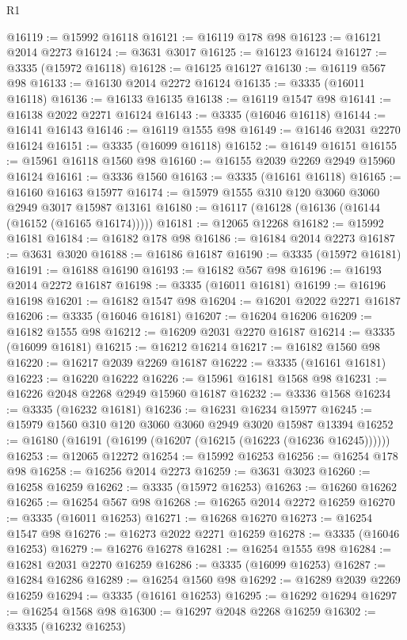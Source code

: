 \begin{lexlean}{R1}
\begin{coremodule}
@16119 := @15992 @16118
@16121 := @16119 @178 @98
@16123 := @16121 @2014 @2273
@16124 := @3631 @3017
@16125 := @16123 @16124
@16127 := @3335 (@15972 @16118)
@16128 := @16125 @16127
@16130 := @16119 @567 @98
@16133 := @16130 @2014 @2272 @16124
@16135 := @3335 (@16011 @16118)
@16136 := @16133 @16135
@16138 := @16119 @1547 @98
@16141 := @16138 @2022 @2271 @16124
@16143 := @3335 (@16046 @16118)
@16144 := @16141 @16143
@16146 := @16119 @1555 @98
@16149 := @16146 @2031 @2270 @16124
@16151 := @3335 (@16099 @16118)
@16152 := @16149 @16151
@16155 := @15961 @16118 @1560 @98
@16160 := @16155 @2039 @2269 @2949 @15960 @16124
@16161 := @3336 @1560
@16163 := @3335 (@16161 @16118)
@16165 := @16160 @16163 @15977
@16174 := @15979 @1555 @310 @120 @3060 @3060 @2949 @3017 @15987 @13161
@16180 := @16117 (@16128 (@16136 (@16144 (@16152 (@16165 @16174)))))
@16181 := @12065 @12268
@16182 := @15992 @16181
@16184 := @16182 @178 @98
@16186 := @16184 @2014 @2273
@16187 := @3631 @3020
@16188 := @16186 @16187
@16190 := @3335 (@15972 @16181)
@16191 := @16188 @16190
@16193 := @16182 @567 @98
@16196 := @16193 @2014 @2272 @16187
@16198 := @3335 (@16011 @16181)
@16199 := @16196 @16198
@16201 := @16182 @1547 @98
@16204 := @16201 @2022 @2271 @16187
@16206 := @3335 (@16046 @16181)
@16207 := @16204 @16206
@16209 := @16182 @1555 @98
@16212 := @16209 @2031 @2270 @16187
@16214 := @3335 (@16099 @16181)
@16215 := @16212 @16214
@16217 := @16182 @1560 @98
@16220 := @16217 @2039 @2269 @16187
@16222 := @3335 (@16161 @16181)
@16223 := @16220 @16222
@16226 := @15961 @16181 @1568 @98
@16231 := @16226 @2048 @2268 @2949 @15960 @16187
@16232 := @3336 @1568
@16234 := @3335 (@16232 @16181)
@16236 := @16231 @16234 @15977
@16245 := @15979 @1560 @310 @120 @3060 @3060 @2949 @3020 @15987 @13394
@16252 := @16180 (@16191 (@16199 (@16207 (@16215 (@16223 (@16236 @16245))))))
@16253 := @12065 @12272
@16254 := @15992 @16253
@16256 := @16254 @178 @98
@16258 := @16256 @2014 @2273
@16259 := @3631 @3023
@16260 := @16258 @16259
@16262 := @3335 (@15972 @16253)
@16263 := @16260 @16262
@16265 := @16254 @567 @98
@16268 := @16265 @2014 @2272 @16259
@16270 := @3335 (@16011 @16253)
@16271 := @16268 @16270
@16273 := @16254 @1547 @98
@16276 := @16273 @2022 @2271 @16259
@16278 := @3335 (@16046 @16253)
@16279 := @16276 @16278
@16281 := @16254 @1555 @98
@16284 := @16281 @2031 @2270 @16259
@16286 := @3335 (@16099 @16253)
@16287 := @16284 @16286
@16289 := @16254 @1560 @98
@16292 := @16289 @2039 @2269 @16259
@16294 := @3335 (@16161 @16253)
@16295 := @16292 @16294
@16297 := @16254 @1568 @98
@16300 := @16297 @2048 @2268 @16259
@16302 := @3335 (@16232 @16253)

\end{coremodule}
\end{lexlean}

